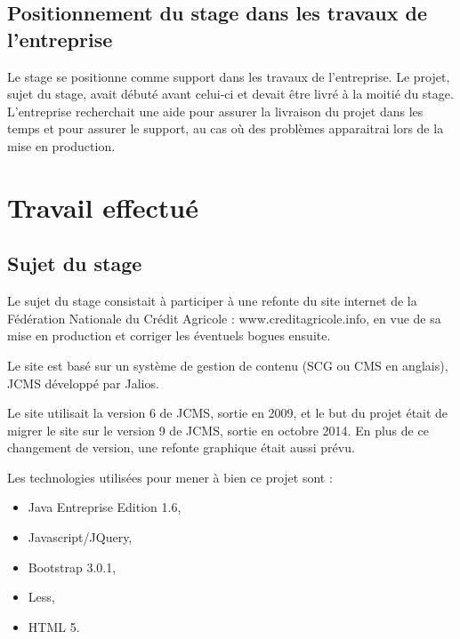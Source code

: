 \documentclass[12pt,a4paper]{article}
\begin{document}
\subsection{Positionnement du stage dans les travaux de l'entreprise}
Le stage se positionne comme support dans les travaux de l'entreprise. Le projet, sujet du stage, avait débuté avant celui-ci et devait être livré à la moitié du stage. L'entreprise recherchait une aide pour assurer la livraison du projet dans les temps et pour assurer le support, au cas où des problèmes apparaitrai lors de la mise en production.

\newpage

\section{Travail effectué}
\subsection{Sujet du stage}
Le sujet du stage consistait à participer à une refonte du site internet de la Fédération Nationale du Crédit Agricole : www.creditagricole.info, en vue de sa mise en production et corriger les éventuels bogues ensuite.\par
Le site est basé sur un système de gestion de contenu (SCG ou CMS en anglais), \gls{JCMS} développé par Jalios.\par
Le site utilisait la version 6 de \gls{JCMS}, sortie en 2009, et le but du projet était de migrer le site sur le version 9 de \gls{JCMS}, sortie en octobre 2014. En plus de ce changement de version, une refonte graphique était aussi prévu.\par
Les technologies utilisées pour mener à bien ce projet sont :
\begin{itemize}
\item Java Entreprise Edition 1.6,
\item Javascript/JQuery,
\item Bootstrap 3.0.1,
\item Less,
\item HTML 5.
\end{itemize}
\end{document}

